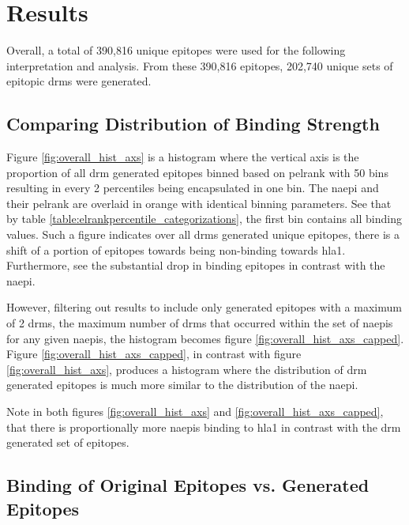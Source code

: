 \section{Results}

Overall, a total of 390,816 unique epitopes were used for the following interpretation and analysis. From these 390,816 epitopes, 202,740 unique sets of epitopic \acp{drm} were generated.

\subsection{Comparing Distribution of Binding Strength}

Figure \ref{fig:overall_hist_axs} is a histogram where the vertical axis is the proportion of all \ac{drm} generated epitopes binned based on \ac{pelrank} with 50 bins resulting in every 2 percentiles being encapsulated in one bin. The \ac{naepi} and their \ac{pelrank} are overlaid in orange with identical binning parameters. See that by table \ref{table:elrankpercentile_categorizations}, the first bin contains all binding values. Such a figure indicates over all \acp{drm} generated unique epitopes, there is a shift of a portion of epitopes towards being non-binding towards \ac{hla1}. Furthermore, see the substantial drop in binding epitopes in contrast with the \ac{naepi}.



However, filtering out results to include only generated epitopes with a maximum of 2 \acp{drm}, the maximum number of \acp{drm} that occurred within the set of \acp{naepi} for any given \acp{naepi}, the histogram becomes figure \ref{fig:overall_hist_axs_capped}. Figure \ref{fig:overall_hist_axs_capped}, in contrast with figure \ref{fig:overall_hist_axs}, produces a histogram where the distribution of \ac{drm} generated epitopes is much more similar to the distribution of the \ac{naepi}.



Note in both figures \ref{fig:overall_hist_axs} and \ref{fig:overall_hist_axs_capped}, that there is proportionally more \acp{naepi} binding to \ac{hla1} in contrast with the \ac{drm} generated set of epitopes.


\subsection{Binding of Original Epitopes vs. Generated Epitopes}

